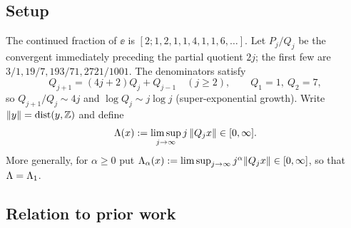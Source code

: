 \subsection{Setup}

The continued fraction of $\ee$ is $[2;1,2,1,1,4,1,1,6,\dots]$. Let $P_j/Q_j$
be the convergent immediately preceding the partial quotient $2j$; the first
few are $3/1,19/7,193/71,2721/1001$. The denominators satisfy
\begin{equation}\label{eq:rec}
Q_{j+1}=(4j+2)Q_j+Q_{j-1}\quad(j\ge2),\qquad Q_1=1,\ Q_2=7,
\end{equation}
so $Q_{j+1}/Q_j\sim 4j$ and $\log Q_j\sim j\log j$ (super-exponential growth).
Write $\|y\|=\operatorname{dist}(y,\mathbb{Z})$ and define
\[
\Lambda(x):=\limsup_{j\to\infty} j\,\|Q_j x\|\in[0,\infty].
\]
More generally, for $\alpha\ge0$ put
$\Lambda_\alpha(x):=\limsup_{j\to\infty} j^\alpha\|Q_j x\|\in[0,\infty]$,
so that $\Lambda=\Lambda_1$.

\subsection{Relation to prior work}\label{sec:prior}

